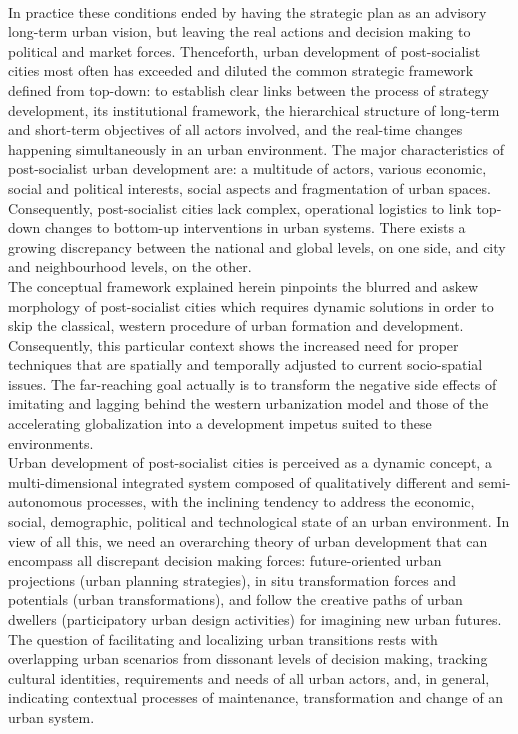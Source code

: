 \documentclass[11pt]{report}
\begin{document}
\\
In practice these conditions ended by having the strategic plan as an advisory long-term urban vision, but leaving the real actions and decision making to political and market forces. Thenceforth, urban development of post-socialist cities most often has exceeded and diluted the common strategic framework defined from top-down: to establish clear links between the process of strategy development, its institutional framework, the hierarchical structure of long-term and short-term objectives of all actors involved, and the real-time changes happening simultaneously in an urban environment. The major characteristics of post-socialist urban development are: a multitude of actors, various economic, social and political interests, social aspects and fragmentation of urban spaces. Consequently, post-socialist cities lack complex, operational logistics \href{check!!!Repetti et al. 2010}{\citealt{check!!!Repetti et al. 2010}} to link top-down changes to bottom-up interventions in urban systems. There exists a growing discrepancy between the national and global levels, on one side, and city and neighbourhood levels, on the other. 
\\
The  conceptual  framework  explained  herein  pinpoints  the  blurred  and  askew  morphology of  post-socialist  cities which  requires  dynamic  solutions  in  order  to  skip  the  classical, western procedure  of  urban  formation  and development. Consequently, this particular context shows the increased need for proper techniques that are spatially and temporally adjusted to current socio-spatial issues. The far-reaching goal actually is to transform the negative side effects of imitating and lagging behind the western urbanization model and those of the accelerating globalization into a development impetus suited to these environments.
\\
Urban development of post-socialist cities is perceived as a dynamic concept, a multi-dimensional integrated system composed of qualitatively different and semi-autonomous processes, with the inclining tendency to address the economic, social, demographic, political and technological state of an urban environment. In view of all this, we need an overarching theory of urban development that can encompass all discrepant decision making forces: future-oriented urban projections (urban planning strategies), in situ transformation forces and potentials (urban transformations), and follow the creative paths of urban dwellers (participatory urban design activities) for imagining new urban futures. The question of facilitating and localizing urban transitions rests with overlapping urban scenarios from dissonant levels of decision making, tracking cultural identities, requirements and needs of all urban actors, and, in general, indicating contextual processes of maintenance, transformation and change of an urban system. 
\end{document}
